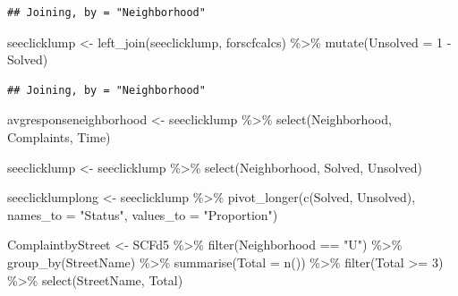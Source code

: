 \documentclass[
]{article}
\newenvironment{Shaded}{\begin{snugshade}}{\end{snugshade}}
\newcommand{\AttributeTok}[1]{\textcolor[rgb]{0.77,0.63,0.00}{#1}}
\newcommand{\DecValTok}[1]{\textcolor[rgb]{0.00,0.00,0.81}{#1}}
\newcommand{\FunctionTok}[1]{\textcolor[rgb]{0.00,0.00,0.00}{#1}}
\newcommand{\NormalTok}[1]{#1}
\newcommand{\OtherTok}[1]{\textcolor[rgb]{0.56,0.35,0.01}{#1}}
\newcommand{\SpecialCharTok}[1]{\textcolor[rgb]{0.00,0.00,0.00}{#1}}
\newcommand{\StringTok}[1]{\textcolor[rgb]{0.31,0.60,0.02}{#1}}
\begin{document}
\begin{verbatim}
## Joining, by = "Neighborhood"
\end{verbatim}

\begin{Shaded}
\begin{Highlighting}[]
\NormalTok{seeclicklump }\OtherTok{\textless{}{-}}  \FunctionTok{left\_join}\NormalTok{(seeclicklump, forscfcalcs) }\SpecialCharTok{\%\textgreater{}\%}
  \FunctionTok{mutate}\NormalTok{(}\AttributeTok{Unsolved =} \DecValTok{1} \SpecialCharTok{{-}}\NormalTok{ Solved)}
\end{Highlighting}
\end{Shaded}

\begin{verbatim}
## Joining, by = "Neighborhood"
\end{verbatim}

\begin{Shaded}
\begin{Highlighting}[]
\NormalTok{avgresponseneighborhood }\OtherTok{\textless{}{-}}\NormalTok{ seeclicklump }\SpecialCharTok{\%\textgreater{}\%}
  \FunctionTok{select}\NormalTok{(Neighborhood, Complaints, Time)}

\NormalTok{seeclicklump }\OtherTok{\textless{}{-}}\NormalTok{ seeclicklump  }\SpecialCharTok{\%\textgreater{}\%}
  \FunctionTok{select}\NormalTok{(Neighborhood, Solved, Unsolved)}

\NormalTok{ seeclicklumplong }\OtherTok{\textless{}{-}}\NormalTok{ seeclicklump }\SpecialCharTok{\%\textgreater{}\%}
  \FunctionTok{pivot\_longer}\NormalTok{(}\FunctionTok{c}\NormalTok{(Solved, Unsolved), }\AttributeTok{names\_to =} \StringTok{"Status"}\NormalTok{, }\AttributeTok{values\_to =} \StringTok{"Proportion"}\NormalTok{)}

\NormalTok{ComplaintbyStreet }\OtherTok{\textless{}{-}}\NormalTok{ SCFd5 }\SpecialCharTok{\%\textgreater{}\%}
  \FunctionTok{filter}\NormalTok{(Neighborhood }\SpecialCharTok{==} \StringTok{"U"}\NormalTok{) }\SpecialCharTok{\%\textgreater{}\%}
  \FunctionTok{group\_by}\NormalTok{(StreetName) }\SpecialCharTok{\%\textgreater{}\%}
  \FunctionTok{summarise}\NormalTok{(}\AttributeTok{Total =} \FunctionTok{n}\NormalTok{()) }\SpecialCharTok{\%\textgreater{}\%}
  \FunctionTok{filter}\NormalTok{(Total }\SpecialCharTok{\textgreater{}=} \DecValTok{3}\NormalTok{) }\SpecialCharTok{\%\textgreater{}\%}
  \FunctionTok{select}\NormalTok{(StreetName, Total)}
\end{Highlighting}
\end{Shaded}
\end{document}
